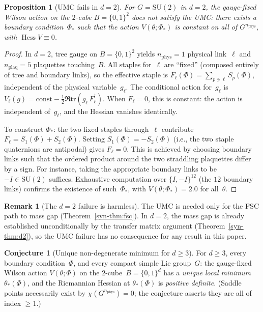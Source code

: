\documentclass[11pt]{article}
\newtheorem{proposition}[theorem]{Proposition}
\theoremstyle{definition}
\newtheorem{conjecture}[theorem]{Conjecture}
\newtheorem{remark}[theorem]{Remark}
\newcommand{\SU}{\mathrm{SU}}
\newcommand{\tr}{\mathrm{tr}}
\newcommand{\Hess}{\operatorname{Hess}}
\begin{document}
\begin{proposition}[UMC fails in $d = 2$]
\label{syn-prop:umc_d2_fail}
For $G = \SU(2)$ in $d = 2$, the gauge-fixed Wilson action on
the $2$-cube $B = \{0,1\}^2$ does \emph{not} satisfy the UMC:
there exists a boundary condition~$\Phi_*$ such that the action
$V(\theta;\Phi_*)$ is constant on all of $G^{n_{\mathrm{phys}}}$,
with $\Hess V \equiv 0$.
\end{proposition}

\begin{proof}
In $d = 2$, tree gauge on $B = \{0,1\}^2$ yields
$n_{\mathrm{phys}} = 1$ physical link~$\ell$ and
$n_{\mathrm{plaq}} = 5$ plaquettes touching~$B$.
All staples for~$\ell$ are ``fixed'' (composed entirely of
tree and boundary links), so the effective staple is
$F_\ell(\Phi) = \sum_{p \ni \ell} S_p(\Phi)$,
independent of the physical variable~$g_\ell$.
The conditional action for~$g_\ell$ is
$V_\ell(g) = \mathrm{const} - \tfrac{1}{2}\Re\tr(g_\ell\,
F_\ell^\dagger)$.
When $F_\ell = 0$, this is constant: the action is independent
of~$g_\ell$, and the Hessian vanishes identically.

To construct $\Phi_*$: the two fixed staples through~$\ell$
contribute $F_\ell = S_1(\Phi) + S_2(\Phi)$.
Setting $S_1(\Phi) = -S_2(\Phi)$ (i.e., the two staple
quaternions are antipodal) gives $F_\ell = 0$.
This is achieved by choosing boundary links such that the
ordered product around the two straddling plaquettes differ
by a sign.  For instance, taking the appropriate boundary
links to be $-I \in \SU(2)$ suffices.
Exhaustive computation over $\{I, -I\}^{12}$ (the $12$
boundary links) confirms the existence of such~$\Phi_*$,
with $V(\theta;\Phi_*) = 2.0$ for all~$\theta$.
\end{proof}

\begin{remark}[The $d = 2$ failure is harmless]
\label{syn-rem:umc_d2}
The UMC is needed only for the FSC path to mass gap
(Theorem~\ref{syn-thm:fsc}).  In $d = 2$, the mass gap is
already established unconditionally by the transfer matrix
argument (Theorem~\ref{syn-thm:d2}), so the UMC failure has
no consequence for any result in this paper.
\end{remark}

\begin{conjecture}[Unique non-degenerate minimum for $d \geq 3$]
\label{syn-conj:unique_min}
For $d \geq 3$, every boundary condition~$\Phi$, and every
compact simple Lie group~$G$: the gauge-fixed Wilson action
$V(\theta;\Phi)$ on the $2$-cube~$B = \{0,1\}^d$ has
a \emph{unique local minimum} $\theta_*(\Phi)$, and the
Riemannian Hessian at $\theta_*(\Phi)$ is
\emph{positive definite}.
\textup{(}Saddle points necessarily exist by
$\chi(G^{n_{\mathrm{phys}}}) = 0$; the conjecture
asserts they are all of index $\geq 1$.\textup{)}
\end{conjecture}
\end{document}
